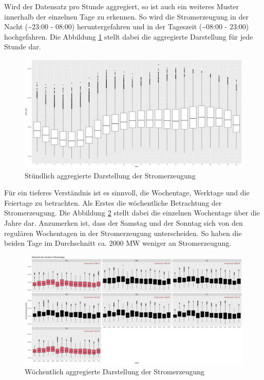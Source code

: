 \documentclass[11pt,ngerman,a4paper,]{article}
\begin{document}
Wird der Datensatz pro Stunde aggregiert, so ist auch ein weiteres Muster innerhalb der einzelnen Tage zu erkennen. So wird die Stromerzeugung in der Nacht (\textasciitilde23:00 - 08:00) heruntergefahren und in der Tageszeit (\textasciitilde08:00 - 23:00) hochgefahren. Die Abbildung \ref{fig:hour_boxplot} stellt dabei die aggregierte Darstellung für jede Stunde dar.

\begin{figure}[H]
\centering
\includegraphics[width=1.0\textwidth]{plots/hour_boxplot.png}
\caption{Stündlich aggregierte Darstellung der Stromerzeugung}
\label{fig:hour_boxplot}
\end{figure}

Für ein tieferes Verständnis ist es sinnvoll, die Wochentage, Werktage und die Feiertage zu betrachten. Als Erstes die wöchentliche Betrachtung der Stromerzeugung. Die Abbildung \ref{fig:weekday_boxplot} stellt dabei die einzelnen Wochentage über die Jahre dar. Anzumerken ist, dass der Samstag und der Sonntag sich von den regulären Wochentagen in der Stromerzeugung unterscheiden. So haben die beiden Tage im Durchschnitt ca. 2000 MW weniger an Stromerzeugung.

\begin{figure}[H]
\centering
\includegraphics[width=1.0\textwidth]{plots/weekday_boxplot.png}
\caption{Wöchentlich aggregierte Darstellung der Stromerzeugung}
\label{fig:weekday_boxplot}
\end{figure}
\end{document}
